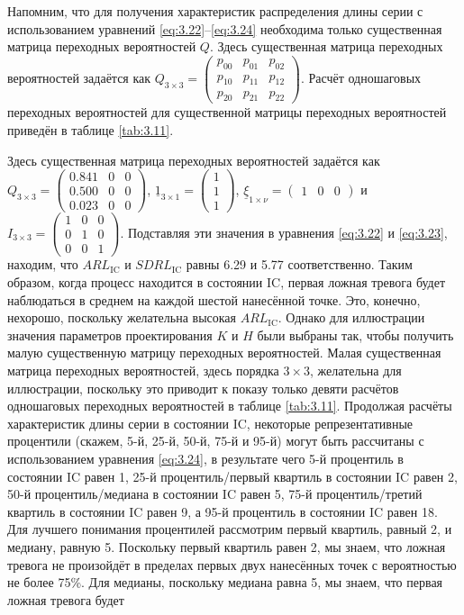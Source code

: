 Напомним, что для получения характеристик распределения длины серии с использованием уравнений \eqref{eq:3.22}–\eqref{eq:3.24} необходима только существенная матрица переходных вероятностей \(Q\). Здесь существенная матрица переходных вероятностей задаётся как \(Q_{3 \times 3} = \left( \begin{array}{ccc} p_{00} & p_{01} & p_{02} \\ p_{10} & p_{11} & p_{12} \\ p_{20} & p_{21} & p_{22} \end{array} \right)\). Расчёт одношаговых переходных вероятностей для существенной матрицы переходных вероятностей приведён в таблице \ref{tab:3.11}.

Здесь существенная матрица переходных вероятностей задаётся как \(Q_{3 \times 3} = \left( \begin{array}{ccc} 0.841 & 0 & 0 \\ 0.500 & 0 & 0 \\ 0.023 & 0 & 0 \end{array} \right)\), \(\underline{1}_{3 \times 1} = \left( \begin{array}{c} 1 \\ 1 \\ 1 \end{array} \right)\), \(\underline{\xi}_{1 \times \nu} = \left( \begin{array}{ccc} 1 & 0 & 0 \end{array} \right)\) и \(I_{3 \times 3} = \left( \begin{array}{ccc} 1 & 0 & 0 \\ 0 & 1 & 0 \\ 0 & 0 & 1 \end{array} \right)\). Подставляя эти значения в уравнения \eqref{eq:3.22} и \eqref{eq:3.23}, находим, что \(ARL_{\text{IC}}\) и \(SDRL_{\text{IC}}\) равны 6.29 и 5.77 соответственно. Таким образом, когда процесс находится в состоянии IC, первая ложная тревога будет наблюдаться в среднем на каждой шестой нанесённой точке. Это, конечно, нехорошо, поскольку желательна высокая \(ARL_{\text{IC}}\). Однако для иллюстрации значения параметров проектирования \(K\) и \(H\) были выбраны так, чтобы получить малую существенную матрицу переходных вероятностей. Малая существенная матрица переходных вероятностей, здесь порядка \(3 \times 3\), желательна для иллюстрации, поскольку это приводит к показу только девяти расчётов одношаговых переходных вероятностей в таблице \ref{tab:3.11}. Продолжая расчёты характеристик длины серии в состоянии IC, некоторые репрезентативные процентили (скажем, 5-й, 25-й, 50-й, 75-й и 95-й) могут быть рассчитаны с использованием уравнения \eqref{eq:3.24}, в результате чего 5-й процентиль в состоянии IC равен 1, 25-й процентиль/первый квартиль в состоянии IC равен 2, 50-й процентиль/медиана в состоянии IC равен 5, 75-й процентиль/третий квартиль в состоянии IC равен 9, а 95-й процентиль в состоянии IC равен 18. Для лучшего понимания процентилей рассмотрим первый квартиль, равный 2, и медиану, равную 5. Поскольку первый квартиль равен 2, мы знаем, что ложная тревога не произойдёт в пределах первых двух нанесённых точек с вероятностью не более 75\%. Для медианы, поскольку медиана равна 5, мы знаем, что первая ложная тревога будет 